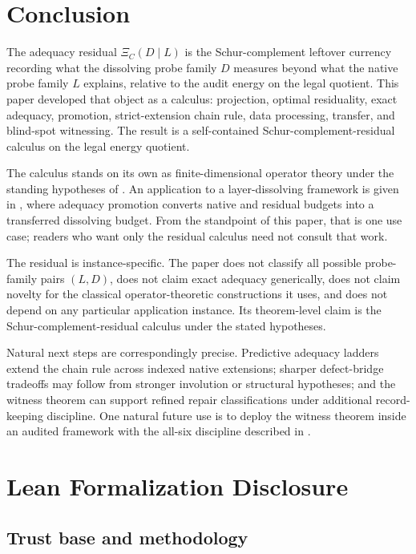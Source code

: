\documentclass[11pt]{article}
\theoremstyle{definition}
\begin{document}
\section{Conclusion}
\label{sec:conclusion}

The adequacy residual \(\Xi_C(D\mid L)\) is the Schur-complement leftover
currency recording what the dissolving probe family \(D\) measures beyond what
the native probe family \(L\) explains, relative to the audit energy on the
legal quotient.  This paper developed that object as a calculus: projection,
optimal residuality, exact adequacy, promotion, strict-extension chain rule,
data processing, transfer, and blind-spot witnessing.  The result is a
self-contained Schur-complement-residual calculus on the legal energy quotient.

The calculus stands on its own as finite-dimensional operator theory under the
standing hypotheses of .  An application to a layer-dissolving
framework is given in \citet{Tsiokos2026NeedleKiller}, where adequacy
promotion converts native and residual budgets into a transferred dissolving
budget.  From the standpoint of this paper, that is one use case; readers who
want only the residual calculus need not consult that work.

The residual is instance-specific.  The paper does not classify all possible
probe-family pairs \((L,D)\), does not claim exact adequacy generically, does
not claim novelty for the classical operator-theoretic constructions it uses,
and does not depend on any particular application instance.  Its theorem-level
claim is the Schur-complement-residual calculus under the stated hypotheses.

Natural next steps are correspondingly precise.  Predictive adequacy ladders
extend the chain rule across indexed native extensions; sharper defect-bridge
tradeoffs may follow from stronger involution or structural hypotheses; and
the witness theorem can support refined repair classifications under additional
record-keeping discipline.  One natural future use is to deploy the witness
theorem inside an audited framework with the all-six discipline described in
\citet{Tsiokos2026NeedleKiller}.
 
\appendix
\section{Lean Formalization Disclosure}
\label{app:formalization}

\subsection{Trust base and methodology}
\label{subsec:paper2-trust-methodology}
\end{document}
